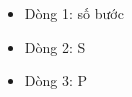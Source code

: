 \begin{itemize}
	\item     Dòng 1: số bước   
	\item     Dòng 2: S   
	\item     Dòng 3: P   
\end{itemize}

\